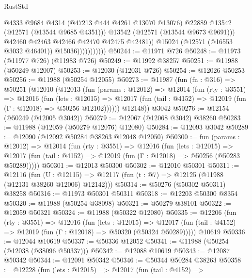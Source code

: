 \begin{lexlean}{RustStd}
\begin{coremodule}
                                  @4333
                                  @9684
                                  @4314
                                  (@47213 @444 @4261 @13070 @13076)
                                  @22889
                                  @13542
                                  (@12571 (@13544 @9685 @4351)))
                                @13542
                                (@12571 (@13544 @9673 @9691)))
                              @42460
                              @42463
                              @42466
                              @42470
                              @42475
                              @42481))
                          @15024
                          (@12571 (@16553 @3032 @46401))
                          @15036)))))))))))
@50244 := @11971 @726
@50248 := @11973 (@11977 @726) (@11983 @726)
@50249 := @11992 @38257
@50251 := @11988 (@50249 @12007)
@50253 := @12030 (@12031 @726)
@50254 := @12026 @50253
@50256 := @11988 (@50254 @12055)
@50273 := @11987
    (fun (fn : @316) =>
    @50251
      (@12010
        (@12013
          (fun (params : @12012) =>
          @12014
            (fun (rty : @3551) =>
            @12016
              (fun (lets : @12015) =>
              @12017 (fun (tail : @4152) => @12019 (fun (Γ : @12018) => @50256 @12102))))))
        @12148))
    @3042
@50276 := @12154 (@50249 (@12005 @3042))
@50279 := @12067 (@12068 @3042) @38260
@50283 := @11988 (@12059 (@50279 @12076) @12080)
@50284 := @12093 @3042
@50289 := @12090 (@12092 @50284 @38263 @12048 @12050)
@50300 := fun (params : @12012) =>
  @12014
    (fun (rty : @3551) =>
    @12016
      (fun (lets : @12015) =>
      @12017 (fun (tail : @4152) => @12019 (fun (Γ : @12018) => @50256 (@50283 @50289)))))
@50301 := @12013 @50300
@50302 := @12010 @50301
@50311 := @12116
    (fun (U : @12115) => @12117 (fun (t : @7) => @12125 (@11988 (@12131 @38260 @12006) @12142)))
@50314 := @50276 (@50302 @50311) @38258
@50316 := @11973 @50301 @50311
@50318 := @12203 @50300 @8354
@50320 := @11988 (@50254 @38098)
@50321 := @50279 @38101
@50322 := @12059 @50321
@50324 := @11988 (@50322 @12080)
@50335 := @12206
    (fun (rty : @3551) =>
    @12016
      (fun (lets : @12015) =>
      @12017 (fun (tail : @4152) => @12019 (fun (Γ : @12018) => @50320 (@50324 @50289)))))
    @10619
@50336 := @12044 @10619
@50337 := @50336 @12052
@50341 := @11988 (@50254 (@12038 (@38096 @50337)))
@50342 := @12088 @10619
@50343 := @12087 @50342
@50344 := @12091 @50342
@50346 := @50344 @50284 @38263
@50358 := @12228
    (fun (lets : @12015) =>
    @12017
      (fun (tail : @4152) =>

\end{coremodule}
\end{lexlean}
